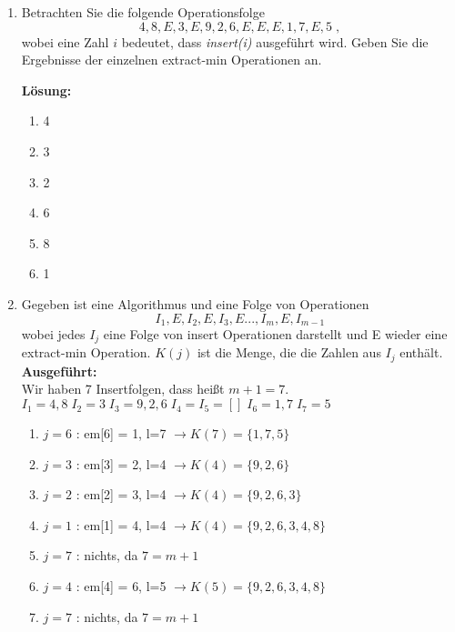 \documentclass[11pt,a4paper,ngerman]{article}
\begin{document}
\begin{enumerate}[\bfseries a)]

\item Betrachten  Sie die folgende Operationsfolge
$$
4,8,E,3,E,9,2,6,E,E,E,1,7,E,5 \; ,
$$
wobei eine Zahl $i$ bedeutet, dass \emph{insert(i)} ausgeführt wird. Geben Sie die Ergebnisse der einzelnen extract-min Operationen an.

\textbf{Lösung:}
\begin{enumerate}
\item 4
\item 3
\item 2
\item 6
\item 8
\item 1
\end{enumerate}

\item Gegeben ist eine Algorithmus und eine Folge von Operationen
$$
I_1,E,I_2,E,I_3,E ...,I_m,E,I_{m-1}
$$
wobei jedes $I_{j}$ eine Folge von insert Operationen darstellt und E wieder eine extract-min Operation. $K(j)$ ist die Menge, die die Zahlen aus $I_j$ enthält.\\

\textbf{Ausgeführt:}\\
Wir haben 7 Insertfolgen, dass heißt $m+1=7$.\\
$I_1 = 4,8 \; I_2 = 3 \; I_3 = 9,2,6 \; I_4 = I_5 = [] \; I_6 = 1,7 \; I_7 = 5$
\begin{enumerate}[{i=}1 $\rightarrow$]

\item $j=6$ : em[6] = 1, l=7 $\rightarrow K(7) = \{1,7,5\} $

\item $j=3$ : em[3] = 2, l=4 $\rightarrow K(4) = \{ 9,2,6 \}$

\item $j=2$ : em[2] = 3, l=4 $\rightarrow K(4) = \{ 9, 2, 6, 3 \}$

\item $j=1$ : em[1] = 4, l=4 $\rightarrow K(4) = \{ 9, 2, 6, 3, 4, 8\}$

\item $j=7$ : nichts, da $7 = m+1$

\item $j=4$ : em[4] = 6, l=5 $\rightarrow K(5) = \{ 9, 2, 6, 3, 4, 8 \}$

\item $j=7$ : nichts, da $7 = m+1$


\end{enumerate}
\end{enumerate}
\end{document}
